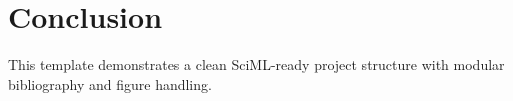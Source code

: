 \documentclass[11pt]{article}
\theoremstyle{definition}
\theoremstyle{remark}
\newtheorem{remark}{Remark}
\theoremstyle{plain}
\begin{document}



\section{Conclusion}
This template demonstrates a clean SciML-ready project structure with modular bibliography and figure handling.


\end{document}
